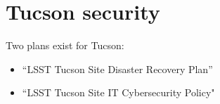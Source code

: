 \section{Tucson security}

Two plans exist for Tucson:

\begin{itemize}
\item “LSST Tucson Site Disaster Recovery Plan” 
\item “LSST Tucson Site IT Cybersecurity Policy" 
\end{itemize}
